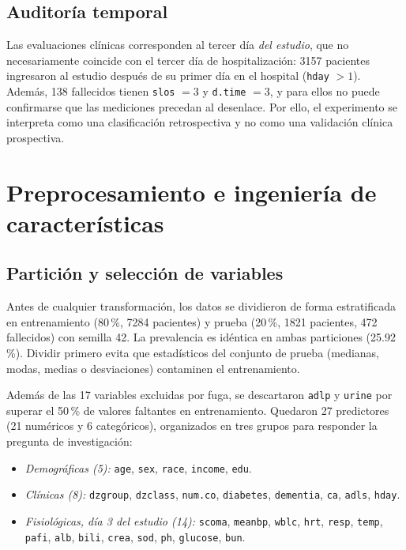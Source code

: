 \documentclass[conference]{IEEEtran}
\begin{document}
\FloatBarrier
\subsection{Auditoría temporal}
Las evaluaciones clínicas corresponden al tercer día \emph{del estudio}, que no necesariamente coincide con el tercer día de hospitalización: 3157 pacientes ingresaron al estudio después de su primer día en el hospital (\texttt{hday} $>1$). Además, 138 fallecidos tienen \texttt{slos} $=3$ y \texttt{d.time} $=3$, y para ellos no puede confirmarse que las mediciones precedan al desenlace. Por ello, el experimento se interpreta como una clasificación retrospectiva y no como una validación clínica prospectiva.

\section{Preprocesamiento e ingeniería de características}
\label{sec:prepro}

\subsection{Partición y selección de variables}
Antes de cualquier transformación, los datos se dividieron de forma estratificada en entrenamiento (80\,\%, 7284 pacientes) y prueba (20\,\%, 1821 pacientes, 472 fallecidos) con semilla 42. La prevalencia es idéntica en ambas particiones (25.92\,\%). Dividir primero evita que estadísticos del conjunto de prueba (medianas, modas, medias o desviaciones) contaminen el entrenamiento.

Además de las 17 variables excluidas por fuga, se descartaron \texttt{adlp} y \texttt{urine} por superar el 50\,\% de valores faltantes en entrenamiento. Quedaron 27 predictores (21 numéricos y 6 categóricos), organizados en tres grupos para responder la pregunta de investigación:
\begin{itemize}
\item \textit{Demográficas (5):} \texttt{age}, \texttt{sex}, \texttt{race}, \texttt{income}, \texttt{edu}.
\item \textit{Clínicas (8):} \texttt{dzgroup}, \texttt{dzclass}, \texttt{num.co}, \texttt{diabetes}, \texttt{dementia}, \texttt{ca}, \texttt{adls}, \texttt{hday}.
\item \textit{Fisiológicas, día 3 del estudio (14):} \texttt{scoma}, \texttt{meanbp}, \texttt{wblc}, \texttt{hrt}, \texttt{resp}, \texttt{temp}, \texttt{pafi}, \texttt{alb}, \texttt{bili}, \texttt{crea}, \texttt{sod}, \texttt{ph}, \texttt{glucose}, \texttt{bun}.
\end{itemize}
\end{document}
